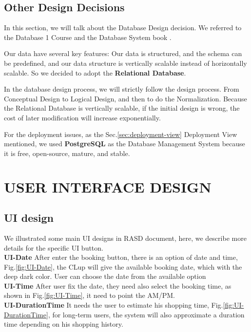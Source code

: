 \documentclass[a4paper,12pt]{report}
\begin{document}
\section{Other Design Decisions}

In this section, we will talk about the Database Design decision. We referred to the Database 1 Course \cite{Database1Course} and the Database System book \cite{DatabaseSystemBook}.

Our data have several key features: Our data is structured, and the schema can be predefined, and our data structure is vertically scalable instead of horizontally scalable.
So we decided to adopt the \textbf{Relational Database}.

In the database design process, we will strictly follow the design process.
From Conceptual Design to Logical Design, and then to do the Normalization.
Because the Relational Database is vertically scalable, if the initial design is wrong, the cost of later modification will increase exponentially.

For the deployment issues, as the Sec.\ref{sec:deployment-view} Deployment View mentioned, we used \textbf{PostgreSQL} as the Database Management System because it is free, open-source, mature, and stable.



\chapter{USER INTERFACE DESIGN}\label{ch:user-interface-design}

\section{UI design}
We illustrated some main UI designs in RASD document, here, we describe more details for the specific UI button. ~\\

\textbf{UI-Date} After enter the booking button, there is an option of date and time, Fig.\ref{fig:UI-Date}, the CLup will give the available booking date, which with the deep dark color. User can choose the date from the available option~\\

\textbf{UI-Time} After user fix the date, they need also select the booking time, as shown in Fig.\ref{fig:UI-Time}, it need to point the AM/PM.~\\

\textbf{UI-DurationTime} It needs the user to estimate his shopping time, Fig.\ref{fig:UI-DurationTime}, for long-term users, the system will also approximate a duration time depending on his shopping history.~\\
\end{document}
